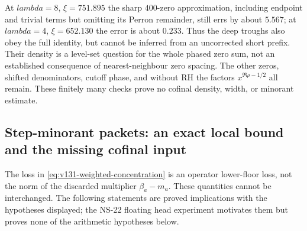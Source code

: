 \documentclass[11pt]{article}
\def\lambda{lambda}%
\theoremstyle{remark}
\begin{document}
At $\lambda=8$, $\xi=751.895$ the sharp $400$-zero approximation,
including endpoint and trivial terms but omitting its Perron remainder,
still errs by about $5.567$; at $\lambda=4$, $\xi=652.130$ the error
is about $0.233$. Thus the deep troughs also obey the full identity,
but cannot be inferred from an uncorrected short prefix. Their density
is a level-set question for the whole phased zero sum, not an established
consequence of nearest-neighbour zero spacing. The other zeros, shifted
denominators, cutoff phase, and without RH the factors
$x^{\Re\rho-1/2}$ all remain. These finitely many checks prove no
cofinal density, width, or minorant estimate.

\subsection{Step-minorant packets: an exact local bound and the missing cofinal input}

The loss in \eqref{eq:v131-weighted-concentration} is an operator
lower-floor loss, not the norm of the discarded multiplier
$\beta_a-m_a$. These quantities cannot be interchanged. The following
statements are proved implications with the hypotheses displayed;
the NS-22 floating head experiment motivates them but proves none of
the arithmetic hypotheses below.
\end{document}
